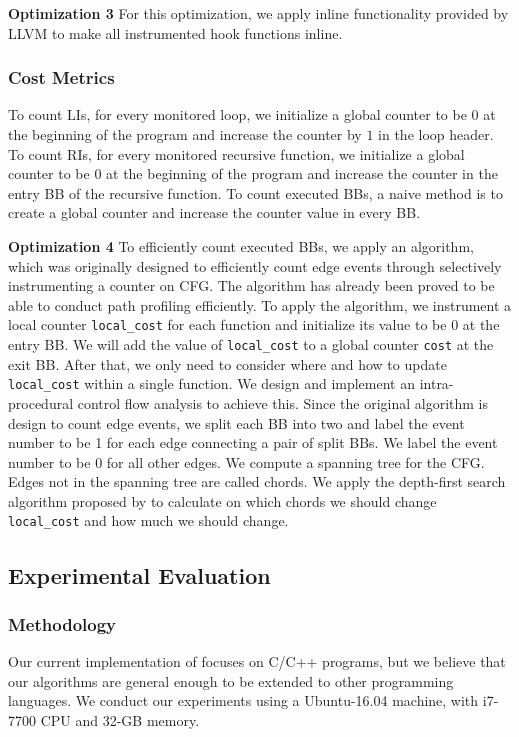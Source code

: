 \textbf{Optimization 3}
For this optimization, we apply inline functionality 
provided by LLVM to make all instrumented hook functions inline.

\subsubsection{Cost Metrics}
To count LIs, for every monitored loop, we initialize 
a global counter to be $0$ at the beginning of the program and 
increase the counter by $1$ in the loop header.
To count RIs, for every monitored recursive function, 
we initialize a global counter to be $0$ at the beginning of the program
and increase the counter 
in the entry BB of the recursive function. 
To count executed BBs, a naive method is to create a global counter
and increase the counter value in every BB. 


\textbf{Optimization 4}
To efficiently count executed BBs, 
we apply an algorithm, which was originally designed to 
efficiently count edge events through selectively instrumenting a counter 
on CFG\cite{event-counting}.
The algorithm has already been proved to be able to 
conduct path profiling efficiently\cite{peter-ase,path-profiling}. 
To apply the algorithm,
we instrument a local counter \texttt{local\_cost} for each function
and initialize its value to be $0$ at the entry BB. 
We will add the value of \texttt{local\_cost} to a global counter \texttt{cost} 
at the exit BB.
After that, we only need to consider where 
and how to update \texttt{local\_cost} 
within a single function.
We design and implement an intra-procedural control flow analysis
to achieve this.
Since the original algorithm is design to count edge events,
we split each BB into two 
and label the event number to be 1 for each edge connecting a pair of split BBs. 
We label the event number to be 0 for all other edges.
We compute a spanning tree\cite{spanning} for the CFG.
Edges not in the spanning tree are called chords.
We apply the depth-first search algorithm proposed by\cite{event-counting} 
to calculate on which chords we should change 
\texttt{local\_cost} 
and how much we should change.

\subsection{Experimental Evaluation}
\label{sec:inhouse_exp}

\subsubsection{Methodology}
Our current implementation of \Tool focuses on C/C++ programs, 
but we believe that our algorithms are general enough to be extended 
to other programming languages.
We conduct our experiments using a Ubuntu-16.04 machine, 
with i7-7700 CPU and 32-GB memory. 


